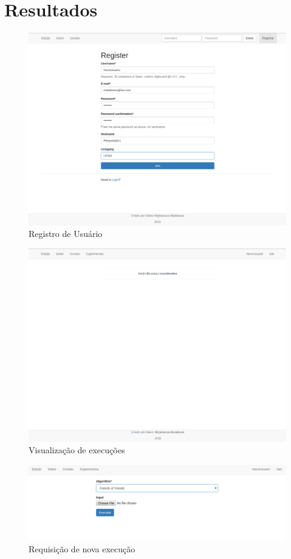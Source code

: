 \documentclass[tg]{mdtufsm}
\begin{document}
\chapter{Resultados}
\begin{figure}
	\centering
	\includegraphics[width=1\textwidth]{res1}
	\caption{
		Registro de Usuário
	}
	\label{fig:res1}
\end{figure}
\begin{figure}
	\centering
	\includegraphics[width=1\textwidth]{res2}
	\caption{
		Visualização de execuções
	}
	\label{fig:res2}
\end{figure}
\begin{figure}
	\centering
	\includegraphics[width=1\textwidth]{res3}
	\caption{
		Requisição de nova execução
	}
	\label{fig:res3}
\end{figure}
\end{document}
